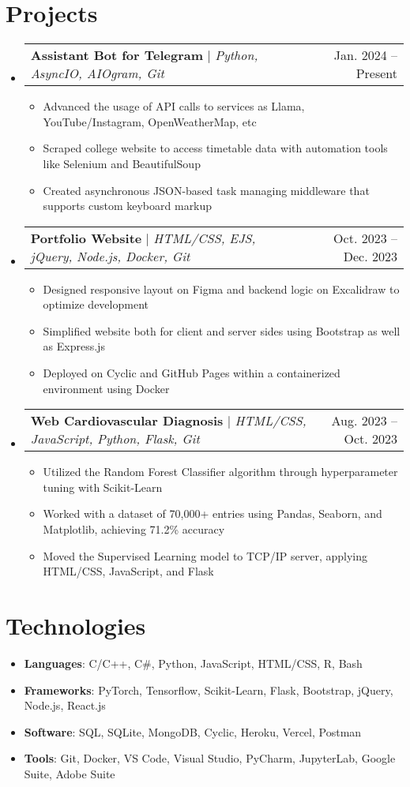 \documentclass[letterpaper,11pt]{article}
\makeatletter
\newcommand{\resumeItem}[1]{
  \item\small{
    {#1 \vspace{-2pt}}
  }
}
\newcommand{\resumeProjectHeading}[2]{
    \item
    \begin{tabular*}{0.97\textwidth}{l@{\extracolsep{\fill}}r}
      \small#1 & #2 \\
    \end{tabular*}\vspace{-7pt}
}
\newcommand{\resumeSubHeadingListStart}{\begin{itemize}[leftmargin=0.15in, label={}]}
\newcommand{\resumeSubHeadingListEnd}{\end{itemize}}
\newcommand{\resumeItemListStart}{\begin{itemize}}
\newcommand{\resumeItemListEnd}{\end{itemize}\vspace{-5pt}}
\makeatother
\begin{document}
\section{Projects}
    \resumeSubHeadingListStart
        \resumeProjectHeading
              {\textbf{Assistant Bot for Telegram} $|$ \emph{Python, AsyncIO, AIOgram, Git}}{Jan. 2024 -- Present}
              \resumeItemListStart
                \resumeItem{Advanced the usage of API calls to services as Llama, YouTube/Instagram, OpenWeatherMap, etc}
                \resumeItem{Scraped college website to access timetable data with automation tools like Selenium and BeautifulSoup}
                \resumeItem{Created asynchronous JSON-based task managing middleware that supports custom keyboard markup}
              \resumeItemListEnd
        \resumeProjectHeading
              {\textbf{Portfolio Website} $|$ \emph{HTML/CSS, EJS, jQuery, Node.js, Docker, Git}}{Oct. 2023 -- Dec. 2023}
              \resumeItemListStart
                \resumeItem{Designed responsive layout on Figma and backend logic on Excalidraw to optimize development}
                \resumeItem{Simplified website both for client and server sides using Bootstrap as well as Express.js}
                \resumeItem{Deployed on Cyclic and GitHub Pages within a containerized environment using Docker}
              \resumeItemListEnd
        \resumeProjectHeading
              {\textbf{Web Cardiovascular Diagnosis} $|$ \emph{HTML/CSS, JavaScript, Python, Flask, Git}}{Aug. 2023 -- Oct. 2023}
              \resumeItemListStart
                \resumeItem{Utilized the Random Forest Classifier algorithm through hyperparameter tuning with Scikit-Learn}
                \resumeItem{Worked with a dataset of 70,000+ entries using Pandas, Seaborn, and Matplotlib, achieving 71.2\% accuracy}
                \resumeItem{Moved the Supervised Learning model to TCP/IP server, applying HTML/CSS, JavaScript, and Flask}
              \resumeItemListEnd
    \resumeSubHeadingListEnd

\section{Technologies}
\resumeSubHeadingListStart
    \resumeItemListStart
        \resumeItem{\textbf{Languages}: C/C++, C\#, Python, JavaScript, HTML/CSS, R, Bash}
        \resumeItem{\textbf{Frameworks}: PyTorch, Tensorflow, Scikit-Learn, Flask, Bootstrap, jQuery, Node.js, React.js}
        \resumeItem{\textbf{Software}: SQL, SQLite, MongoDB, Cyclic, Heroku, Vercel, Postman}
        \resumeItem{\textbf{Tools}: Git, Docker, VS Code, Visual Studio, PyCharm, JupyterLab, Google Suite, Adobe Suite}
      \resumeItemListEnd
\resumeSubHeadingListEnd
\end{document}
